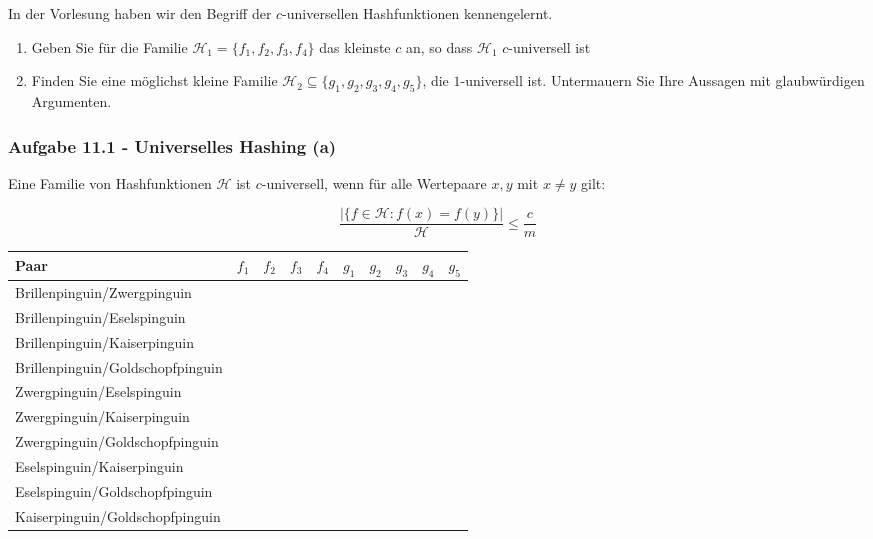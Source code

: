 \documentclass{beamer}
\begin{document}
\begin{frame}
	In der Vorlesung haben wir den Begriff der $c$-universellen Hashfunktionen kennengelernt.

	\begin{enumerate}
		\renewcommand{\theenumi}{\alph{enumi}}
		\item Geben Sie für die Familie $\mathcal{H}_1 = \{ f_1, f_2, f_3, f_4 \}$ das kleinste $c$ an, so dass $\mathcal{H}_1$ $c$-universell ist
		\item Finden Sie eine möglichst kleine Familie $\mathcal{H}_2 \subseteq \{ g_1, g_2, g_3, g_4, g_5 \}$, die $1$-universell ist.
		      Untermauern Sie Ihre Aussagen mit glaubwürdigen Argumenten.
	\end{enumerate}
\end{frame}

\begin{frame}[t]
	\frametitle{Aufgabe 11.1 - Universelles Hashing (a)}
	\small
	Eine Familie von Hashfunktionen $\mathcal{H}$ ist $c$-universell, wenn für alle Wertepaare $x, y$ mit $x \neq y$ gilt:

	$$\frac{|\{ f \in \mathcal{H} : f(x) = f(y) \}|}{\mathcal{H}} \leq \frac{c}{m}$$

	\begin{table}
		\tiny
		\centering
		\begin{tabular}{|l||c|c|c|c||c|c|c|c|c|}
			\hline
			Paar                             & $f_1$ & $f_2$ & $f_3$ & $f_4$ & $g_1$ & $g_2$ & $g_3$ & $g_4$ & $g_5$ \\
			\hline\hline
			Brillenpinguin/Zwergpinguin      &       &       &       &       &       &       &       &       &       \\
			\hline
			Brillenpinguin/Eselspinguin      &       &       &       &       &       &       &       &       &       \\
			\hline
			Brillenpinguin/Kaiserpinguin     &       &       &       &       &       &       &       &       &       \\
			\hline
			Brillenpinguin/Goldschopfpinguin &       &       &       &       &       &       &       &       &       \\
			\hline
			Zwergpinguin/Eselspinguin        &       &       &       &       &       &       &       &       &       \\
			\hline
			Zwergpinguin/Kaiserpinguin       &       &       &       &       &       &       &       &       &       \\
			\hline
			Zwergpinguin/Goldschopfpinguin   &       &       &       &       &       &       &       &       &       \\
			\hline
			Eselspinguin/Kaiserpinguin       &       &       &       &       &       &       &       &       &       \\
			\hline
			Eselspinguin/Goldschopfpinguin   &       &       &       &       &       &       &       &       &       \\
			\hline
			Kaiserpinguin/Goldschopfpinguin  &       &       &       &       &       &       &       &       &       \\
			\hline
		\end{tabular}
	\end{table}
\end{frame}
\end{document}
